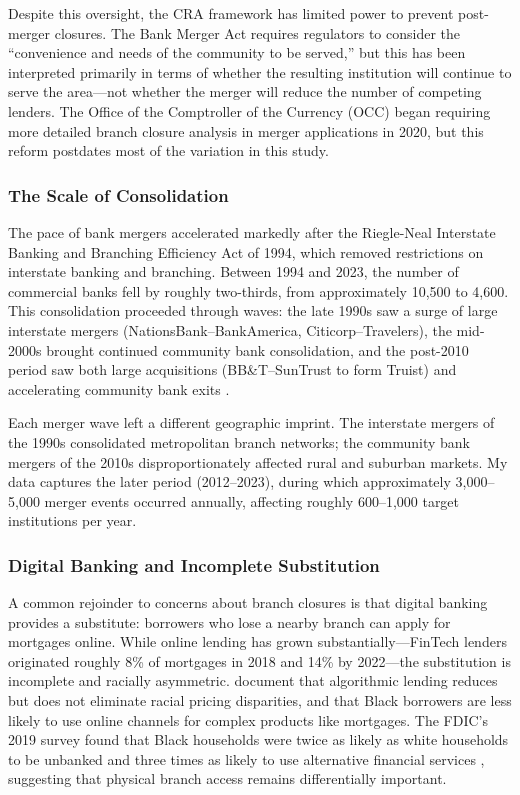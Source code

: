 \documentclass[12pt]{article}
\begin{document}
Despite this oversight, the CRA framework has limited power to prevent post-merger closures. The Bank Merger Act requires regulators to consider the ``convenience and needs of the community to be served,'' but this has been interpreted primarily in terms of whether the resulting institution will continue to serve the area---not whether the merger will reduce the number of competing lenders. The Office of the Comptroller of the Currency (OCC) began requiring more detailed branch closure analysis in merger applications in 2020, but this reform postdates most of the variation in this study.

\subsubsection*{The Scale of Consolidation} The pace of bank mergers accelerated markedly after the Riegle-Neal Interstate Banking and Branching Efficiency Act of 1994, which removed restrictions on interstate banking and branching. Between 1994 and 2023, the number of commercial banks fell by roughly two-thirds, from approximately 10,500 to 4,600. This consolidation proceeded through waves: the late 1990s saw a surge of large interstate mergers (NationsBank--BankAmerica, Citicorp--Travelers), the mid-2000s brought continued community bank consolidation, and the post-2010 period saw both large acquisitions (BB\&T--SunTrust to form Truist) and accelerating community bank exits \citep{strahan2003}.

Each merger wave left a different geographic imprint. The interstate mergers of the 1990s consolidated metropolitan branch networks; the community bank mergers of the 2010s disproportionately affected rural and suburban markets. My data captures the later period (2012--2023), during which approximately 3,000--5,000 merger events occurred annually, affecting roughly 600--1,000 target institutions per year.

\subsubsection*{Digital Banking and Incomplete Substitution} A common rejoinder to concerns about branch closures is that digital banking provides a substitute: borrowers who lose a nearby branch can apply for mortgages online. While online lending has grown substantially---FinTech lenders originated roughly 8\% of mortgages in 2018 and 14\% by 2022---the substitution is incomplete and racially asymmetric. \citet{bartlett2022} document that algorithmic lending reduces but does not eliminate racial pricing disparities, and that Black borrowers are less likely to use online channels for complex products like mortgages. The FDIC's 2019 survey found that Black households were twice as likely as white households to be unbanked and three times as likely to use alternative financial services \citep{fdic2019}, suggesting that physical branch access remains differentially important.
\end{document}
